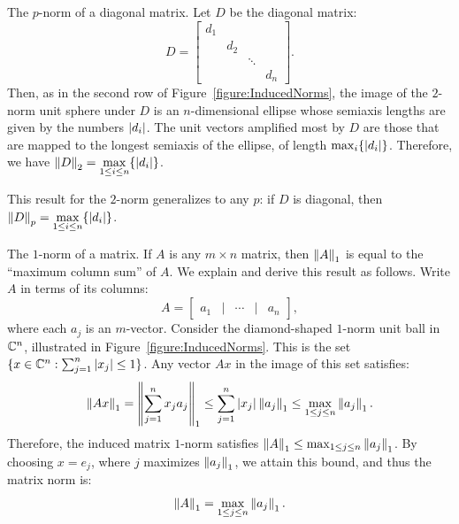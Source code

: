 \begin{example}\label{example:diagonalpnorm}
The $p$-norm of a diagonal matrix. Let $D$ be the diagonal matrix:
\begin{equation}
D = \begin{bmatrix} d_1\\ &d_2\\&&\ddots\\&&&d_n\end{bmatrix}.
\end{equation}
Then, as in the second row of Figure~\ref{figure:InducedNorms}, the image of the $2$-norm unit sphere under $D$ is an $n$-dimensional ellipse whose semiaxis lengths are given by the numbers $\left|{d_i}\right|$. The unit vectors amplified most by $D$ are those that are mapped to the longest semiaxis of the ellipse, of length $\max_i\{\left|{d_i}\right|\}$. Therefore, we have $\displaystyle \left\|{D}\right\|_2 = \max_{1\le i\le n}\{\left|{d_i}\right|\}$.

This result for the $2$-norm generalizes to any $p$: if $D$ is diagonal, then $\displaystyle \left\|{D}\right\|_p = \max_{1\le i\le n}\{\left|{d_i}\right|\}$.
\end{example}

\begin{example}
The $1$-norm of a matrix. If $A$ is any $m\times n$ matrix, then $\left\|{A}\right\|_1$ is equal to the ``maximum column sum'' of $A$. We explain and derive this result as follows. Write $A$ in terms of its columns:
\begin{equation}
A = \begin{bmatrix} a_1 & \Bigg| & \cdots & \Bigg| & a_n\end{bmatrix},
\end{equation}
where each $a_j$ is an $m$-vector. Consider the diamond-shaped $1$-norm unit ball in $\mathbb{C}^n$, illustrated in Figure~\ref{figure:InducedNorms}. This is the set $\{x\in\mathbb{C}^n:\sum_{j=1}^n\left|{x_j}\right| \le 1\}$. Any vector $Ax$ in the image of this set satisfies:
\begin{equation}
\left\|{Ax}\right\|_1 = \left\|{\sum_{j=1}^nx_ja_j}\right\|_1 \le \sum_{j=1}^n\left|{x_j}\right|\left\|{a_j}\right\|_1 \le \max_{1\le j\le n}\left\|{a_j}\right\|_1.
\end{equation}
Therefore, the induced matrix $1$-norm satisfies $\left\|{A}\right\|_1 \le \max_{1\le j\le n}\left\|{a_j}\right\|_1$. By choosing $x=e_j$, where $j$ maximizes $\left\|{a_j}\right\|_1$, we attain this bound, and thus the matrix norm is:
\begin{equation}
\left\|{A}\right\|_1 = \max_{1\le j\le n}\left\|{a_j}\right\|_1.
\end{equation}
\end{example}

